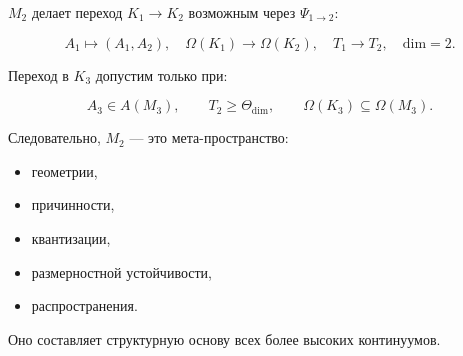$M_2$ делает переход $K_1 \to K_2$ возможным через $\Psi_{1\to2}$:

\[
A_1 \mapsto (A_1, A_2),\quad
\Omega(K_1) \to \Omega(K_2),\quad
T_1 \to T_2,\quad
\text{dim} = 2.
\]

Переход в $K_3$ допустим только при:

\[
A_3 \in A(M_3),\qquad
T_2 \ge \Theta_{\text{dim}},
\qquad
\Omega(K_3) \subseteq \Omega(M_3).
\]

Следовательно, $M_2$ — это мета-пространство:

\begin{itemize}
    \item геометрии,
    \item причинности,
    \item квантизации,
    \item размерностной устойчивости,
    \item распространения.
\end{itemize}

Оно составляет структурную основу всех более высоких континуумов.
